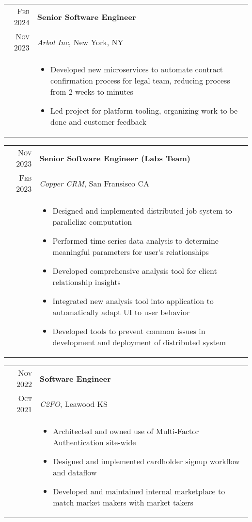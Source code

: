 \documentclass[a4paper,10pt]{article}
\begin{document}
\begin{tabular}{r|p{15cm}}
  \textsc{Feb 2024}  & \textbf{Senior Software Engineer} \\
  \textsc{Nov 2023} & \textit{Arbol Inc}, New York, NY
  \\ &  
       \begin{itemize}
       \item Developed new microservices to automate contract confirmation process for legal team, reducing
             process from 2 weeks to minutes
       \item Led project for platform tooling, organizing work to be done and customer feedback
       \end{itemize} \\
\end{tabular}

\begin{tabular}{r|p{15cm}}
  \textsc{Nov 2023}  & \textbf{Senior Software Engineer (Labs Team)} \\
  \textsc{Feb 2023} & \textit{Copper CRM}, San Fransisco CA
  \\ &  
       \begin{itemize}
       \item Designed and implemented distributed job system to parallelize computation
       \item Performed time-series data analysis to determine meaningful parameters for user’s relationships
       \item Developed comprehensive analysis tool for client relationship insights
       \item Integrated new analysis tool into application to automatically adapt UI to user behavior
       \item Developed tools to prevent common issues in development and deployment of distributed system
       \end{itemize} \\
\end{tabular}

\begin{tabular}{r|p{15cm}}
  \textsc{Nov 2022} & \textbf{Software Engineer} \\
  \textsc{Oct 2021} & \textit{C2FO}, Leawood KS
  \\ &  
       \begin{itemize}
       \item Architected and owned use of Multi-Factor Authentication site-wide
       \item Designed and implemented cardholder signup workflow and dataflow
       \item Developed and maintained internal marketplace to match market makers with market takers
       \end{itemize} \\
\end{tabular}
\end{document}
